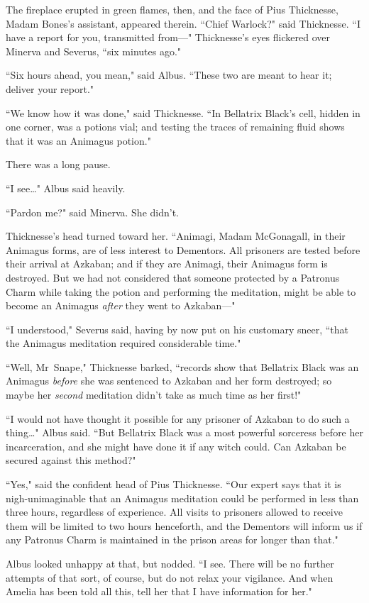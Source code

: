 The fireplace erupted in green flames, then, and the face of Pius Thicknesse, Madam Bones's assistant, appeared therein. ``Chief Warlock?" said Thicknesse. ``I have a report for you, transmitted from—" Thicknesse's eyes flickered over Minerva and Severus, ``six minutes ago."

``Six hours ahead, you mean," said Albus. ``These two are meant to hear it; deliver your report."

``We know how it was done," said Thicknesse. ``In Bellatrix Black's cell, hidden in one corner, was a potions vial; and testing the traces of remaining fluid shows that it was an Animagus potion."

There was a long pause.

``I see…" Albus said heavily.

``Pardon me?" said Minerva. She didn't.

Thicknesse's head turned toward her. ``Animagi, Madam McGonagall, in their Animagus forms, are of less interest to Dementors. All prisoners are tested before their arrival at Azkaban; and if they are Animagi, their Animagus form is destroyed. But we had not considered that someone protected by a Patronus Charm while taking the potion and performing the meditation, might be able to become an Animagus \emph{after} they went to Azkaban—"

``I understood," Severus said, having by now put on his customary sneer, ``that the Animagus meditation required considerable time."

``Well, Mr~Snape," Thicknesse barked, ``records show that Bellatrix Black was an Animagus \emph{before} she was sentenced to Azkaban and her form destroyed; so maybe her \emph{second} meditation didn't take as much time as her first!"

``I would not have thought it possible for any prisoner of Azkaban to do such a thing…" Albus said. ``But Bellatrix Black was a most powerful sorceress before her incarceration, and she might have done it if any witch could. Can Azkaban be secured against this method?"

``Yes," said the confident head of Pius Thicknesse. ``Our expert says that it is nigh-unimaginable that an Animagus meditation could be performed in less than three hours, regardless of experience. All visits to prisoners allowed to receive them will be limited to two hours henceforth, and the Dementors will inform us if any Patronus Charm is maintained in the prison areas for longer than that."

Albus looked unhappy at that, but nodded. ``I see. There will be no further attempts of that sort, of course, but do not relax your vigilance. And when Amelia has been told all this, tell her that I have information for her."

